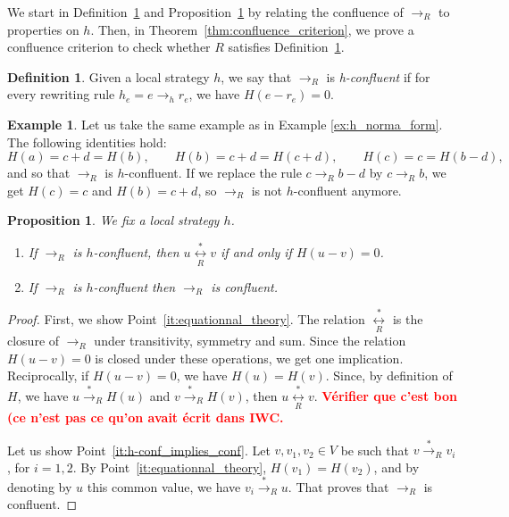 \documentclass[10pt]{easychair}
\newtheorem{proposition}[theorem]{Proposition}
\theoremstyle{definition}
\newtheorem{definition}[theorem]{Definition}
\newtheorem{example}[theorem]{Example}
\newcommand\todo[1]{{\bf\textcolor{red}{#1.}}}
\newcommand\rewR{\to_R}
\newcommand\rewh{\to_h}
\newcommand\transR{\overset{*}{\to}_R}
\newcommand\equivR{\underset{R}{\overset{*}{\leftrightarrow}}}
\begin{document}
We start in Definition~\ref{def:standardisation_property} and 
Proposition~\ref{prop:h_and_R_confluence} by relating the confluence of
$\rewR$ to properties on $h$. Then, in
Theorem~\ref{thm:confluence_criterion}, we prove a confluence criterion
to check whether $R$ satisfies
Definition~\ref{def:standardisation_property}.

\begin{definition}\label{def:standardisation_property}
  Given a local strategy $h$, we say that $\rewR$ is \emph{h-confluent}
  if for every rewriting rule $h_e=e\rewh r_e$, we have $H(e-r_e)=0$.
\end{definition}
\smallskip

\begin{example}
  Let us take the same example as in Example \ref{ex:h_norma_form}. The
  following identities hold:
  \[
  H(a)=c+d=H(b),\qquad H(b)=c+d=H(c+d),\qquad H(c)=c= H(b-d),
  \]
  and so that $\rewR$ is $h$-confluent. If we replace the rule
  $c\rewR b-d$ by $c\rewR b$, we get $H(c)=c$ and $H(b)=c+d$, so $\rewR$
  is not $h$-confluent anymore. 
\end{example}
\smallskip

\begin{proposition}\label{prop:h_and_R_confluence}
  We fix a  local strategy $h$.
  \begin{enumerate}
  \item\label{it:equationnal_theory} If $\rewR$ is $h$-confluent, then
    $u\equivR v$ if and only if $H(u-v)=0$.
  \item\label{it:h-conf_implies_conf} If $\rewR$ is $h$-confluent then
    $\rewR$ is confluent.
  \end{enumerate}
\end{proposition}

\begin{proof}
  First, we show Point~\ref{it:equationnal_theory}. The relation
  $\equivR$ is the closure of $\rewR$ under transitivity, symmetry and
  sum. Since the relation $H(u - v) = 0$ is closed under these
  operations, we get one implication. Reciprocally, if $H(u-v)=0$, we
  have $H(u)=H(v)$. Since, by definition of $H$, we have
  $u\transR H(u)$ and $v\transR H(v)$, then $u\equivR v$.
  \todo{Vérifier que c'est bon (ce n'est pas ce qu'on avait écrit dans
    IWC}
  \smallskip
  
  Let us show Point~\ref{it:h-conf_implies_conf}. Let $v,v_1,v_2\in V$ be
  such that $v\transR v_i$, for $i=1,2$. By
  Point~\ref{it:equationnal_theory}, $H(v_1)=H(v_2)$, and by denoting by
  $u$ this common value, we have $v_i\transR u$. That proves that $\rewR$
  is confluent.
\end{proof}
\medskip
\end{document}
